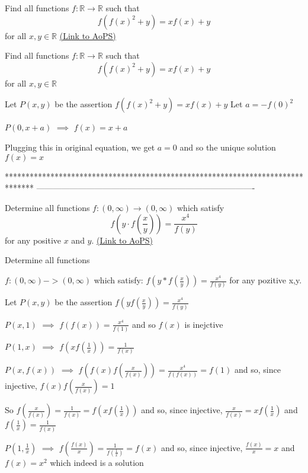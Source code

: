 \begin{problem}
	Find all functions $f:\mathbb{R}\rightarrow\mathbb{R}$ such that
\[ f(f(x)^2+y) = xf(x)+y \]
for all $x,y\in\mathbb{R}$
	\flushright \href{https://artofproblemsolving.com/community/c6h454479}{(Link to AoPS)}
\end{problem}



\begin{solution}
	\begin{tcolorbox}Find all functions $f:\mathbb{R}\rightarrow\mathbb{R}$ such that
\[ f(f(x)^2+y) = xf(x)+y \]
for all $x,y\in\mathbb{R}$\end{tcolorbox}
Let $P(x,y)$ be the assertion $f(f(x)^2+y)=xf(x)+y$
Let $a=-f(0)^2$

$P(0,x+a)$ $\implies$ $f(x)=x+a$

Plugging this in original equation, we get $a=0$ and so the unique solution $\boxed{f(x)=x}$
\end{solution}
*******************************************************************************
-------------------------------------------------------------------------------

\begin{problem}
	Determine all functions $ f:(0,\infty) \to (0,\infty) $ which satisfy
\[f\left(y \cdot f\left(\frac{x}{y}\right)\right)=\frac{x^4}{f(y)} \]
for any positive $x$ and $y$.
	\flushright \href{https://artofproblemsolving.com/community/c6h454506}{(Link to AoPS)}
\end{problem}



\begin{solution}
	\begin{tcolorbox}\begin{bolded}Determine all functions\end{bolded} $ f:(0,\infty)->(0,\infty) $ which satisfy:
$ f(y*f(\frac{x}{y}))=\frac{x^4}{f(y)} $ for any pozitive x,y.\end{tcolorbox}
Let $P(x,y)$ be the assertion $f(yf(\frac xy))=\frac{x^4}{f(y)}$

$P(x,1)$ $\implies$ $f(f(x))=\frac{x^4}{f(1)}$ and so $f(x)$ is inejctive

$P(1,x)$ $\implies$ $f(xf(\frac 1x))=\frac{1}{f(x)}$

$P(x,f(x))$ $\implies$ $f(f(x)f(\frac x{f(x)}))=\frac{x^4}{f(f(x))}=f(1)$ and so, since injective, $f(x)f(\frac x{f(x)})=1$

So $f(\frac x{f(x)})=\frac 1{f(x)}=f(xf(\frac 1x))$ and so, since injective, $\frac x{f(x)}=xf(\frac 1x)$ and $f(\frac 1x)=\frac 1{f(x)}$

$P(1,\frac 1x)$ $\implies$ $f(\frac{f(x)}x)=\frac{1}{f(\frac 1x)}=f(x)$ and so, since injective, $\frac{f(x)}x=x$ and $\boxed{f(x)=x^2}$ which indeed is a solution
\end{solution}



